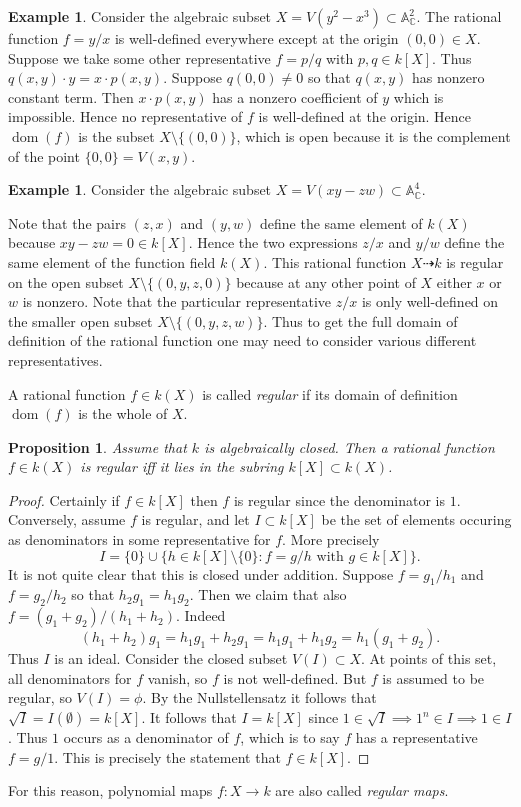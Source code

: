 \documentclass [12pt,oneside,a4paper,mathscr]{amsart}
\newtheorem{prop}[thm]{Proposition}
\theoremstyle{definition}
\newtheorem{example}[thm]{Example}
\newcommand {\A}{\mathbb A}
\newcommand {\C}{\mathbb C}
\newcommand{\dom}{\operatorname{dom}}
\begin{document}
\begin{example}
Consider the algebraic subset $X=V(y^2-x^3)\subset \A^2_\C$. The rational function $f=y/x$ is well-defined everywhere except at the origin $(0,0)\in X$. Suppose we take some other representative $f=p/q$ with $p,q\in k[X]$. Thus $q(x,y)\cdot y = x\cdot p(x,y)$. Suppose $q(0,0)\neq 0$ so that $q(x,y)$ has nonzero constant term. Then $x\cdot p(x,y)$ has a nonzero coefficient of $y$ which is impossible. Hence no representative of $f$ is well-defined at the origin.
Hence $\dom(f)$ is the  subset $X\setminus \{(0,0)\}$, which is open because it is the complement of the point $\{0,0\}=V(x,y)$.
\end{example}


\begin{example}
Consider the algebraic subset $X=V(xy-zw)\subset \A^4_\C$. 

 Note that  the pairs $(z,x)$ and $(y,w)$ define the same element of $k(X)$ because $xy-zw=0\in k[X]$. Hence the two expressions $z/x$ and $y/w$ define the same element of the function field $k(X)$. This rational function $X \dashrightarrow k$ is regular on the open subset $X\setminus \{(0,y,z,0)\}$ because at any other point of $X$ either $x$ or $w$ is nonzero. Note that the particular representative $z/x$ is only well-defined on the smaller open subset $X\setminus \{(0,y,z,w)\}$. Thus to get the full domain of definition of the rational function one may need to consider various different representatives.
\end{example}


A rational function $f\in k(X)$  is called \emph{regular} if its domain of definition $\operatorname{dom}(f)$ is the whole of $X$.

\begin{prop}
Assume that $k$ is algebraically closed. Then a rational function  $f\in k(X)$ is 
 regular iff it lies in the subring $k[X]\subset k(X)$.
\end{prop}

\begin{proof}
Certainly if $f\in k[X]$ then $f$ is regular since the denominator is $1$.
Conversely, assume $f$ is regular, and
let $I\subset k[X]$ be the set of elements occuring as denominators  in some representative for $f$. More precisely
\[I=\{0\}\cup \{h\in k[X]\setminus\{0\}: f=g/h\text{ with }g\in k[X]\}.\]
It is not quite clear that this is closed under addition. Suppose $f=g_1/h_1$ and$f=g_2/h_2$ so that $h_2 g_1=h_1 g_2$. Then we claim that also $f=(g_1+g_2)/(h_1+h_2)$. Indeed
\[(h_1+h_2) g_1= h_1g_1+h_2g_1=h_1 g_1+h_1g_2=h_1(g_1+g_2).\]
Thus $I$ is an ideal. Consider the closed subset $V(I)\subset X$. At points of this set, all denominators for $f$ vanish, so $f$ is not well-defined. But $f$ is assumed to be regular, so $V(I)=\phi$. By the Nullstellensatz it follows that $\sqrt{I}=I(\emptyset)=k[X]$. It follows that $I=k[X]$ since $1\in \sqrt{I}\implies 1^n\in I\implies 1\in I$. Thus $1$ occurs as a denominator of $f$, which is to say $f$ has a representative $f=g/1$. This is precisely the statement that $f\in k[X]$.
\end{proof}



For this reason, polynomial maps $f\colon X \to k$ are also called \emph{regular maps}.
\end{document}

